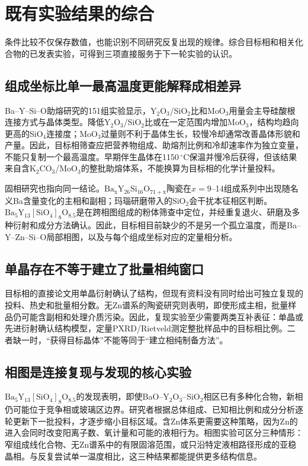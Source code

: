 \section{既有实验结果的综合}
\label{sec:prior-findings}

条件比较不仅保存数值，也能识别不同研究反复出现的规律。综合目标相和相关化合物的已发表实验，可得到三项直接服务于下一轮实验的认识。

\subsection{组成坐标比单一最高温度更能解释成相差异}

Ba--Y--Si--O助熔研究的151组实验显示，Y$_2$O$_3$/SiO$_2$比和MoO$_3$用量会主导硅酸根连接方式与晶体类型。降低Y$_2$O$_3$/SiO$_2$比或在一定范围内增加MoO$_3$，结构均趋向更高的SiO$_4$连接度；MoO$_3$过量则不利于晶体生长，较慢冷却通常改善晶体形貌和产量\cite{wierzbickawieczorek2017high}。因此，目标相筛查应把营养物组成、助熔剂比例和冷却速率作为独立变量，不能只复制一个最高温度。早期伴生晶体在1150\,$^\circ$C保温并慢冷后获得，但该结果来自含K$_2$CO$_3$/MoO$_3$的整批助熔体系，不能换算为目标相的化学计量投料\cite{kolitsch2009crystal}。

固相研究也指向同一结论。$\mathrm{Ba_xY_{26}Si_{16}O_{71+x}}$陶瓷在$x=9$--14组成系列中出现随名义Ba含量变化的主相和副相；玛瑙研磨带入的SiO$_2$会干扰本征相区判断\cite{yamane2024microstructure}。$\mathrm{Ba_5Y_{13}[SiO_4]_8O_{8.5}}$是在跨相图组成的粉体筛查中定位，并经重复退火、研磨及多种衍射和成分方法确认\cite{gulay2024navigation}。因此，目标相目前缺少的不是另一个孤立温度，而是Ba--Y--Zn--Si--O局部相图，以及与每个组成坐标对应的定量相分析。

\subsection{单晶存在不等于建立了批量相纯窗口}

目标相的直接论文用单晶衍射确认了结构，但现有资料没有同时给出可独立复现的投料、热史和批量相分数\cite{ababaikeri2024ba5y12zn}。无Zn谱系的陶瓷研究则表明，即使形成主相，批量样品仍可能含副相和处理介质污染\cite{yamane2024microstructure,gulay2024navigation}。因此，复现实验至少需要两类互补表征：单晶或先进衍射确认结构模型，定量PXRD/Rietveld测定整批样品中的目标相比例。二者缺一时，“获得目标晶体”不能等同于“建立相纯制备方法”。

\subsection{相图是连接复现与发现的核心实验}

$\mathrm{Ba_5Y_{13}[SiO_4]_8O_{8.5}}$的发现表明，即使BaO--Y$_2$O$_3$--SiO$_2$相区已有多种化合物，新相仍可能位于竞争相或玻璃区边界。研究者根据总体组成、已知相比例和成分分析逐轮更新下一批投料，才逐步缩小目标区域\cite{gulay2024navigation}。含Zn体系更需要这种策略，因为Zn的进入会同时改变阳离子数、氧计量和可能的液相行为。相图实验可区分三种情形：窄组成线化合物、无Zn谱系中的有限固溶范围，或只沿特定液相路径形成的亚稳晶相。与反复尝试单一温度相比，这三种结果都能提供更多结构信息。
